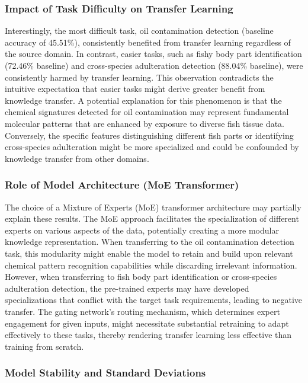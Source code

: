 \subsubsection{Impact of Task Difficulty on Transfer Learning}

Interestingly, the most difficult task, oil contamination detection (baseline accuracy of 45.51\%), consistently benefited from transfer learning regardless of the source domain. In contrast, easier tasks, such as fishy body part identification (72.46\% baseline) and cross-species adulteration detection (88.04\% baseline), were consistently harmed by transfer learning. This observation contradicts the intuitive expectation that easier tasks might derive greater benefit from knowledge transfer. A potential explanation for this phenomenon is that the chemical signatures detected for oil contamination may represent fundamental molecular patterns that are enhanced by exposure to diverse fish tissue data. Conversely, the specific features distinguishing different fish parts or identifying cross-species adulteration might be more specialized and could be confounded by knowledge transfer from other domains.

\subsubsection{Role of Model Architecture (MoE Transformer)}

The choice of a Mixture of Experts (MoE) transformer architecture may partially explain these results. The MoE approach facilitates the specialization of different experts on various aspects of the data, potentially creating a more modular knowledge representation. When transferring to the oil contamination detection task, this modularity might enable the model to retain and build upon relevant chemical pattern recognition capabilities while discarding irrelevant information. However, when transferring to fish body part identification or cross-species adulteration detection, the pre-trained experts may have developed specializations that conflict with the target task requirements, leading to negative transfer. The gating network's routing mechanism, which determines expert engagement for given inputs, might necessitate substantial retraining to adapt effectively to these tasks, thereby rendering transfer learning less effective than training from scratch.

\subsubsection{Model Stability and Standard Deviations}

